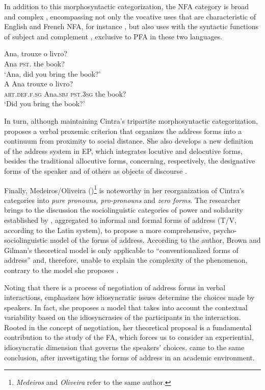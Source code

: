 \documentclass[output=paper]{langscibook}
\begin{document}
In addition to this morphosyntactic categorization, the NFA category is broad and complex \citep[7]{Kerbrat-Orecchioni2010}, encompassing not only the vocative uses  that are characteristic of English and French NFA, for instance \citep{Formentelli2009}, but also uses with the syntactic functions of subject and complement , exclusive to PFA in these two languages.


\ea\label{ex:marques:1}
 \gll Ana,  trouxe o livro?\\
        Ana \textsc{pst}.   the  book?\\
\glt ‘Ana, did you bring the book?’\\
\ex\label{ex:marques:2}
 \gll A              Ana      trouxe      o livro?\\
        \textsc{art.def.f.sg}    Ana.\textsc{sbj}  \textsc{pst.3sg}      the book?\\
\glt ‘Did you bring the book?’
\z 


In turn, although maintaining Cintra’s tripartite morphosyntactic categorization, \citet{Carreira1997,Carreira2004,Carreira2007} proposes a verbal proxemic criterion that organizes the address forms into a continuum from proximity to social distance. She also develops a new definition of the address system in EP, which integrates locutive and delocutive forms, besides the traditional allocutive forms, concerning, respectively, the designative forms of the speaker and of others as objects of discourse \citep{Carreira1997}. 



Finally, Medeiros/Oliveira (\citeyear{Medeiros1985, Medeiros1992, Oliveira2004})\footnote{\textit{Medeiros} and \textit{Oliveira} refer to the same author.} is noteworthy in her reorganization of Cintra’s categories into \textit{pure pronouns, pro-pronouns} and \textit{zero forms}. The researcher brings to the discussion the sociolinguistic categories of power and solidarity established by \citet{BrownGilman1960}, aggregated to informal and formal forms of address (T/V, according to the Latin system), to propose a more comprehensive, psycho-sociolinguistic model of the forms of address. According to the author, Brown and Gilman’s theoretical model is only applicable to “conventionalized forms of address” and, therefore, unable to explain the complexity of the phenomenon, contrary to the model she proposes \citep[340]{Medeiros1992}.



Noting that there is a process of negotiation of address forms in verbal interactions, \citet[335/338]{Medeiros1992} emphasizes how idiosyncratic issues determine the choices made by speakers. In fact, she proposes a model that takes into account the contextual variability based on the idiosyncrasies of the participants in the interaction. Rooted in the concept of negotiation, her theoretical proposal is a fundamental contribution to the study of the FA, which forces us to consider an experiential, idiosyncratic dimension that governs the speakers’ choices. \citet{Formentelli2009} came to the same conclusion, after investigating the forms of address in an academic environment.
\end{document}
